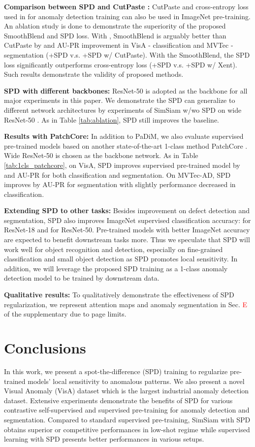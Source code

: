 \documentclass[runningheads]{llncs}
\begin{document}
\noindent\textbf{Comparison between SPD and CutPaste \cite{li2021cutpaste}:} CutPaste and cross-entropy loss used in \cite{li2021cutpaste} for anomaly detection training can also be used in ImageNet pre-training. An ablation study is done to demonstrate the superiority of the proposed SmoothBlend and SPD loss. With , SmoothBlend is arguably better than CutPaste by  and  AU-PR improvement in VisA - classification and MVTec - segmentation (+SPD v.s. +SPD w/ CutPaste). With the SmoothBlend, the SPD loss significantly outperforms cross-entropy loss (+SPD v.s. +SPD w/ Xent). Such results demonstrate the validity of proposed methods.

\noindent\textbf{SPD with different backbones:} ResNet-50 is adopted as the backbone for all major experiments in this paper. We demonstrate the SPD can generalize to different network architectures by experiments of SimSiam w/wo SPD on wide ResNet-50 \cite{zagoruyko2016wide}. As in Table \ref{tab:ablation}, SPD still improves the baseline.

\noindent\textbf{Results with PatchCore: }
In addition to PaDiM, we also evaluate supervised pre-trained models based on another state-of-the-art 1-class method PatchCore \cite{Roth_2022_CVPR}. Wide ResNet-50 is chosen as the backbone network. As in Table \ref{tab:1cls_patchcore}, on VisA, SPD improves supervised pre-trained model by  and  AU-PR for both classification and segmentation. On MVTec-AD, SPD improves by  AU-PR for segmentation with slightly performance decreased in classification.

\noindent\textbf{Extending SPD to other tasks:} Besides improvement on defect detection and segmentation, SPD also improves ImageNet supervised classification accuracy:   for ResNet-18 and  for ResNet-50.
Pre-trained models with better ImageNet accuracy are expected to benefit downstream tasks more. Thus we speculate that SPD will work well for object recognition and detection, especially on fine-grained classification and small object detection as SPD promotes local sensitivity. In addition, we will leverage the proposed SPD training as a 1-class anomaly detection model to be trained by downstream data.

\noindent\textbf{Qualitative results:} To qualitatively demonstrate the effectiveness of SPD regularization, we represent attention maps and anomaly segmentation in Sec. \textcolor{red}{E} of the supplementary due to page limits.

\section{Conclusions}
In this work, we present a spot-the-difference (SPD) training to regularize pre-trained models' local sensitivity to anomalous patterns. We also present a novel Visual Anomaly (VisA) dataset which is the largest industrial anomaly detection dataset. Extensive experiments demonstrate the benefits of SPD for various contrastive self-supervised and supervised pre-training for anomaly detection and segmentation. Compared to standard supervised pre-training, SimSiam with SPD obtains superior or competitive performances in low-shot regime while supervised learning with SPD presents better performances in various setups. 
\end{document}
